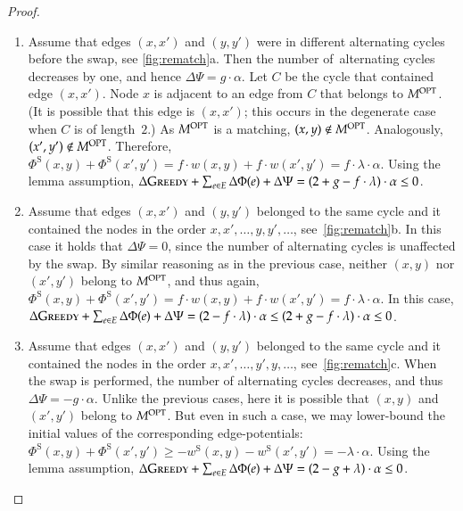 \documentclass[11pt,a4paper]{scrartcl}
\newcommand{\GREEDY}{\textsc{Greedy}\xspace}
\newcommand{\MOPT}{M^\textsc{OPT}}
\newcommand{\Phiinit}{\Phi^\textrm{S}}
\newcommand{\winit}{w^\textrm{S}}
\begin{document}
\begin{proof}
\begin{enumerate}

\item
Assume that edges $(x,x')$ and $(y,y')$ were in different alternating
cycles before the swap, see \cref{fig:rematch}a. Then the number
of~alternating cycles decreases by one, and hence $\Delta \Psi = g \cdot
\alpha$. Let $C$ be the cycle that contained edge $(x,x')$. Node $x$ is adjacent
to an edge from $C$ that belongs to $\MOPT$. (It is possible that this edge is
$(x,x')$; this occurs in the degenerate case when $C$ is of length~$2$.) As
$\MOPT$ is a matching, $(x,y) \notin \MOPT$. Analogously, $(x',y') \notin
\MOPT$. Therefore, $\Phiinit(x,y) + \Phiinit(x',y') = f \cdot w(x,y) + f \cdot
w(x',y') = f \cdot \lambda \cdot \alpha$. Using the lemma assumption,
$\Delta \GREEDY + \sum_{e \in E} \Delta \Phi(e) + \Delta\Psi = (2 + g - f
\cdot \lambda) \cdot \alpha \leq 0$.

\item
Assume that edges $(x,x')$ and $(y,y')$ belonged to the same cycle and
it contained the nodes in the order $x,x',\ldots,y,y',\ldots$,
see~\cref{fig:rematch}b. In this case it holds that 
$\Delta \Psi = 0$, since 
the number of alternating cycles is unaffected by the swap. By similar
reasoning as in the previous case, neither $(x,y)$ nor $(x',y')$ belong to
$\MOPT$, and thus again, $\Phiinit(x,y) + \Phiinit(x',y') = f \cdot w(x,y) + f
\cdot w(x',y') = f \cdot \lambda \cdot \alpha$. In this case, $\Delta \GREEDY
+ \sum_{e \in E} \Delta \Phi(e) + \Delta\Psi = (2 - f \cdot \lambda) \cdot
\alpha \leq (2 + g - f \cdot \lambda) \cdot \alpha \leq 0$.

\item 
Assume that edges $(x,x')$ and $(y,y')$ belonged to the same cycle and
it contained the nodes in the order $x,x',\ldots,y',y,\ldots$,
see~\cref{fig:rematch}c. When the swap is performed, the number of
alternating cycles decreases, and thus $\Delta \Psi = -g \cdot \alpha$. Unlike
the previous cases, here it is possible that $(x,y)$ and $(x',y')$ belong to
$\MOPT$. But even in such a case, we may lower-bound the initial values of the
corresponding edge-potentials: $\Phiinit(x,y) + \Phiinit(x',y') \geq -
\winit(x,y) - \winit(x',y') = - \lambda \cdot \alpha$. Using the lemma
assumption, $\Delta \GREEDY + \sum_{e \in E} \Delta \Phi(e) + \Delta\Psi = (2
- g + \lambda) \cdot \alpha \leq 0$.
\end{enumerate}

\end{proof}
\end{document}
